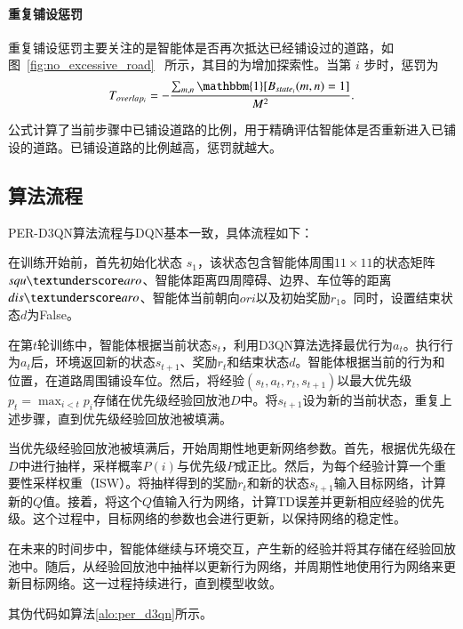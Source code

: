 \paragraph{重复铺设惩罚}
重复铺设惩罚主要关注的是智能体是否再次抵达已经铺设过的道路，如图~\ref{fig:no_excessive_road}~ 所示，其目的为增加探索性。当第 $i$ 步时，惩罚为
\begin{equation}
    T_{overlap_i} = -\frac{\sum_{m,n} \mathbbm{1}[B_{state_i}(m,n)=1]}{M^2}.
\end{equation}

公式计算了当前步骤中已铺设道路的比例，用于精确评估智能体是否重新进入已铺设的道路。已铺设道路的比例越高，惩罚就越大。
\subsection{算法流程}
PER-D3QN算法流程与DQN基本一致，具体流程如下：

在训练开始前，首先初始化状态 $s_1$，该状态包含智能体周围$11\times11$的状态矩阵$squ\textunderscore aro$、智能体距离四周障碍、边界、车位等的距离$dis\textunderscore aro$、智能体当前朝向$ori$以及初始奖励$r_1$。同时，设置结束状态$d$为False。

在第$t$轮训练中，智能体根据当前状态$s_t$，利用D3QN算法选择最优行为$a_t$。执行行为$a_t$后，环境返回新的状态$s_{t+1}$、奖励$r_t$和结束状态$d$。智能体根据当前的行为和位置，在道路周围铺设车位。然后，将经验$(s_t, a_t, r_t, s_{t+1})$以最大优先级$p_t = \max_{i<t} p_i$存储在优先级经验回放池$D$中。将$s_{t+1}$设为新的当前状态，重复上述步骤，直到优先级经验回放池被填满。

当优先级经验回放池被填满后，开始周期性地更新网络参数。首先，根据优先级在$D$中进行抽样，采样概率$P(i)$与优先级$P$成正比。然后，为每个经验计算一个重要性采样权重（ISW）。将抽样得到的奖励$r_t$和新的状态$s_{t+1}$输入目标网络，计算新的$Q$值。接着，将这个$Q$值输入行为网络，计算TD误差并更新相应经验的优先级。这个过程中，目标网络的参数也会进行更新，以保持网络的稳定性。

在未来的时间步中，智能体继续与环境交互，产生新的经验并将其存储在经验回放池中。随后，从经验回放池中抽样以更新行为网络，并周期性地使用行为网络来更新目标网络。这一过程持续进行，直到模型收敛。

其伪代码如算法\ref{alo:per_d3qn}所示。

